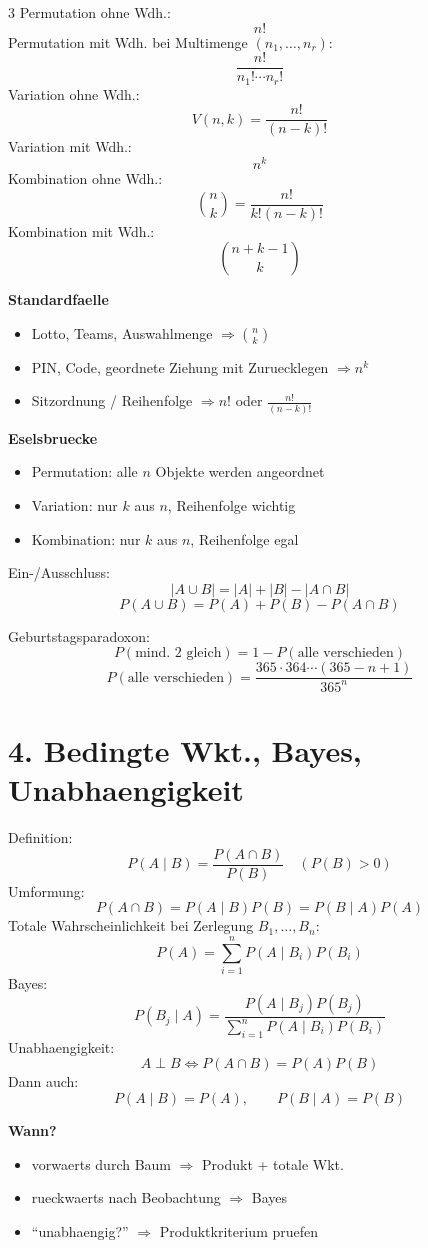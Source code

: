 \documentclass[a4paper,8pt,landscape]{article}
\begin{document}
\begin{multicols*}{3}
Permutation ohne Wdh.:
\[
n!
\]
Permutation mit Wdh. bei Multimenge $(n_1,\dots,n_r)$:
\[
\frac{n!}{n_1!\cdots n_r!}
\]
Variation ohne Wdh.:
\[
V(n,k)=\frac{n!}{(n-k)!}
\]
Variation mit Wdh.:
\[
n^k
\]
Kombination ohne Wdh.:
\[
\binom{n}{k}=\frac{n!}{k!(n-k)!}
\]
Kombination mit Wdh.:
\[
\binom{n+k-1}{k}
\]

\textbf{Standardfaelle}
\begin{itemize}
  \item Lotto, Teams, Auswahlmenge $\Rightarrow \binom{n}{k}$
  \item PIN, Code, geordnete Ziehung mit Zuruecklegen $\Rightarrow n^k$
  \item Sitzordnung / Reihenfolge $\Rightarrow n!$ oder $\frac{n!}{(n-k)!}$
\end{itemize}

\textbf{Eselsbruecke}
\begin{itemize}
  \item Permutation: alle $n$ Objekte werden angeordnet
  \item Variation: nur $k$ aus $n$, Reihenfolge wichtig
  \item Kombination: nur $k$ aus $n$, Reihenfolge egal
\end{itemize}

Ein-/Ausschluss:
\[
|A\cup B|=|A|+|B|-|A\cap B|
\]
\[
P(A\cup B)=P(A)+P(B)-P(A\cap B)
\]

Geburtstagsparadoxon:
\[
P(\text{mind. 2 gleich})=1-P(\text{alle verschieden})
\]
\[
P(\text{alle verschieden})=\frac{365\cdot364\cdots(365-n+1)}{365^n}
\]

\section*{4. Bedingte Wkt., Bayes, Unabhaengigkeit}
Definition:
\[
P(A\mid B)=\frac{P(A\cap B)}{P(B)} \quad (P(B)>0)
\]
Umformung:
\[
P(A\cap B)=P(A\mid B)P(B)=P(B\mid A)P(A)
\]
Totale Wahrscheinlichkeit bei Zerlegung $B_1,\dots,B_n$:
\[
P(A)=\sum_{i=1}^n P(A\mid B_i)P(B_i)
\]
Bayes:
\[
P(B_j\mid A)=\frac{P(A\mid B_j)P(B_j)}{\sum_{i=1}^n P(A\mid B_i)P(B_i)}
\]
Unabhaengigkeit:
\[
A\perp B \iff P(A\cap B)=P(A)P(B)
\]
Dann auch:
\[
P(A\mid B)=P(A),\qquad P(B\mid A)=P(B)
\]

\textbf{Wann?}
\begin{itemize}
  \item vorwaerts durch Baum $\Rightarrow$ Produkt + totale Wkt.
  \item rueckwaerts nach Beobachtung $\Rightarrow$ Bayes
  \item ``unabhaengig?'' $\Rightarrow$ Produktkriterium pruefen
\end{itemize}


\end{multicols*}
\end{document}
